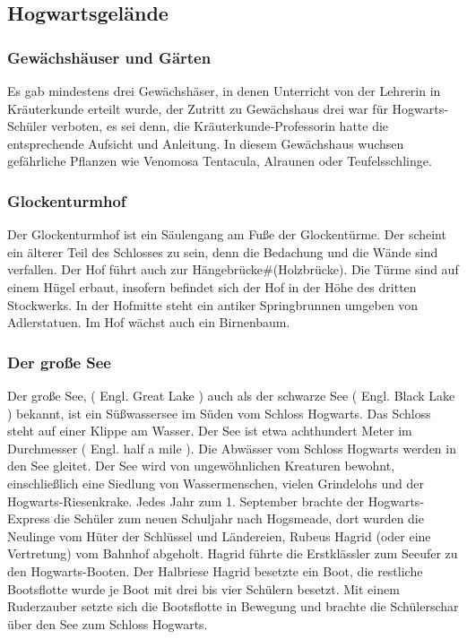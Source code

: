 \documentclass[a4paper, 10pt]{article}
\begin{document}
\subsection*{\Large Hogwartsgelände}
\subsubsection*{\large Gewächshäuser und Gärten}
Es gab mindestens drei Gewächshäser, in denen Unterricht von der Lehrerin in Kräuterkunde erteilt wurde, der Zutritt zu Gewächshaus drei war für Hogwarts-Schüler verboten, es sei denn, die Kräuterkunde-Professorin hatte die entsprechende Aufsicht und Anleitung. In diesem Gewächshaus wuchsen gefährliche Pflanzen wie Venomosa Tentacula, Alraunen oder Teufelsschlinge.
\subsubsection*{\large Glockenturmhof}
Der Glockenturmhof ist ein Säulengang am Fuße der Glockentürme. Der scheint ein älterer Teil des Schlosses zu sein, denn die Bedachung und die Wände sind verfallen. Der Hof führt auch zur Hängebrücke#(Holzbrücke). Die Türme sind auf einem Hügel erbaut, insofern befindet sich der Hof in der Höhe des dritten Stockwerks. In der Hofmitte steht ein antiker Springbrunnen umgeben von Adlerstatuen. Im Hof wächst auch ein Birnenbaum.

\subsubsection*{\large Der große See}
Der große See, (  Engl.  Great Lake ) auch als der schwarze See (  Engl.  Black Lake ) bekannt, ist ein Süßwassersee im Süden vom Schloss Hogwarts. Das Schloss steht auf einer Klippe am Wasser. Der See ist etwa achthundert Meter im Durchmesser (  Engl.  half a mile ). Die Abwässer vom Schloss Hogwarts werden in den See gleitet. Der See wird von ungewöhnlichen Kreaturen bewohnt, einschließlich eine Siedlung von Wassermenschen, vielen Grindelohs und der Hogwarts-Riesenkrake.
\vspace{10pt}
\newline
{}  
Jedes Jahr zum 1. September brachte der Hogwarts-Express die Schüler zum neuen Schuljahr nach Hogsmeade, dort wurden die Neulinge vom Hüter der Schlüssel und Ländereien, Rubeus Hagrid (oder eine Vertretung) vom Bahnhof abgeholt. Hagrid führte die Erstklässler zum Seeufer zu den Hogwarts-Booten. Der Halbriese Hagrid besetzte ein Boot, die restliche Bootsflotte wurde je Boot mit drei bis vier Schülern besetzt. Mit einem Ruderzauber setzte sich die Bootsflotte in Bewegung und brachte die Schülerschar über den See zum Schloss Hogwarts.
\end{document}
